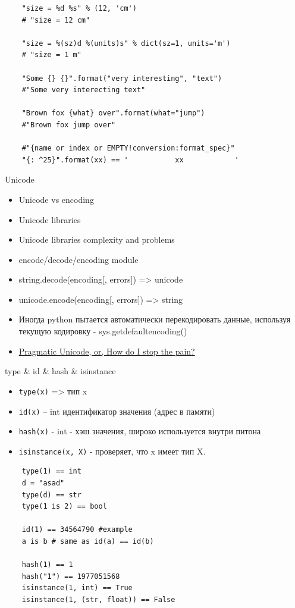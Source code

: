 \documentclass{article}
\begin{document}
\vspace{15pt}
\begin{lstlisting}
	"size = %d %s" % (12, 'cm') 
	# "size = 12 cm"

	"size = %(sz)d %(units)s" % dict(sz=1, units='m') 
	# "size = 1 m"

	"Some {} {}".format("very interesting", "text")
	#"Some very interecting text"

	"Brown fox {what} over".format(what="jump")
	#"Brown fox jump over"

	#"{name or index or EMPTY!conversion:format_spec}"
	"{: ^25}".format(xx) == '           xx            '
\end{lstlisting}
\newpage

\begin{center} Unicode \end{center}
\begin{itemize}
	\item Unicode vs encoding
	\item Unicode libraries
	\item Unicode libraries complexity and problems
	\item encode/decode/encoding module
	\item string.decode(encoding[, errors]) => unicode
	\item unicode.encode(encoding[, errors]) => string
	\item Иногда python пытается автоматически перекодировать 
			данные, используя текущую кодировку - sys.getdefaultencoding()
	\item \href{http://www.youtube.com/watch?feature=player_embedded&v=sgHbC6udIqc}
				{Pragmatic Unicode, or, How do I stop the pain?}
\end{itemize}
\newpage

\begin{center} type \& id \& hash \& isinstance \end{center}
\begin{itemize}
	\item \lstinline!type(x)! => тип x
	\item \lstinline!id(x)! – int идентификатор значения (адрес в памяти)
	\item \lstinline!hash(x)! - int - хэш значения, широко используется внутри питона
	\item \lstinline!isinstance(x, X)! - проверяет, что x имеет тип X.
\end{itemize}
\vspace{15pt}
\begin{lstlisting}
	type(1) == int
	d = "asad"
	type(d) == str
	type(1 is 2) == bool

	id(1) == 34564790 #example
	a is b # same as id(a) == id(b)

	hash(1) == 1
	hash("1") == 1977051568
	isinstance(1, int) == True
	isinstance(1, (str, float)) == False
\end{lstlisting}
\newpage
\end{document}

